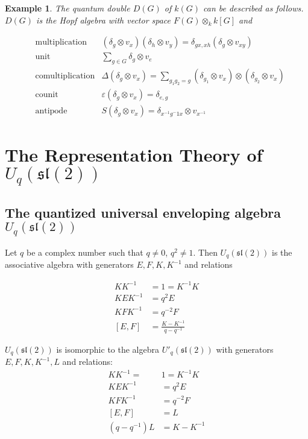 \documentclass[]{article}
\newtheorem{example}[theorem]{Example}
\newcommand{\sll}{\mathfrak{sl}}
\numberwithin{equation}{subsection}
\begin{document}
\begin{example}
    The quantum double $D(G)$ of $k(G)$ can be described as follows. $D(G)$ is the Hopf algebra with vector space $F(G) \otimes_k k[G]$ and 

    \begin{align}
        &\text{multiplication} &(\delta_g\otimes v_x) (\delta_h \otimes v_y) = \delta_{gx,xh} (\delta_g \otimes v_{xy})\\
        &\text{unit}           &\sum_{g \in G} \delta_g  \otimes v_e\\
        &\text{comultiplication} &\Delta(\delta_g \otimes v_x) = \sum_{g_1 g_2 = g} (\delta_{g_1} \otimes v_x) \otimes (\delta_{g_2} \otimes v_x) \\
        &\text{counit}           &\varepsilon(\delta_g \otimes v_x) = \delta_{e,g} \\
        &\text{antipode}         &S(\delta_g \otimes v_x) = \delta_{x^{-1}g^-1 x} \otimes v_{x^{-1}}
    \end{align}


\end{example}


\section{The Representation Theory of $U_q(\sll(2))$}
\subsection{The quantized universal enveloping algebra $U_q(\sll(2))$}
Let $q$ be a complex number such that $q \neq 0$, $q^2 \neq 1$.  Then $U_q(\sll(2))$ is the associative algebra with generators $E,F,K, K^{-1}$ and relations 

\begin{align}
    KK^{-1} &= 1 = K^{-1}K \\
    KEK^{-1} &= q^2 E \\
    KFK^{-1} &= q^{-2} F \\
    [E,F] &= \frac{K - K^{-1}}{q - q^{-1}}
\end{align}


$U_q(\sll(2))$ is isomorphic to the algebra $U'_q(\sll(2))$ with generators $E,F,K,K^{-1},L$ and relations:
\begin{align}
    KK^{-1} =\ &1 = K^{-1}K \\
    KEK^{-1} &= q^2 E \\
    KFK^{-1} &= q^{-2} F \\
    [E,F] &= L \\
    (q - q^{-1})L &= K-K^{-1} 
\end{align}
\end{document}
